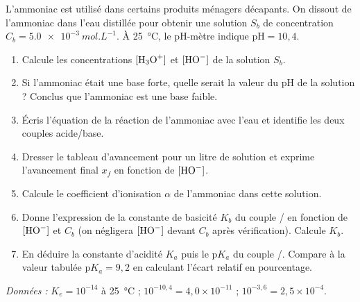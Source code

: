 \documentclass[11pt]{article}
\begin{document}
\begin{exercice}
L'ammoniac  est utilisé dans certains produits ménagers décapants. On dissout de l'ammoniac dans l'eau distillée pour obtenir une solution $S_b$ de concentration $C_b = \SI{5,0e-3}{mol.L^{-1}}$. À \SI{25}{\celsius}, le pH-mètre indique $\mathrm{pH} = 10,4$.
\begin{enumerate}
\item Calcule les concentrations $[\ce{H3O+}]$ et $[\ce{HO-}]$ de la solution $S_b$.
\item Si l'ammoniac était une base forte, quelle serait la valeur du pH de la solution ? Conclus que l'ammoniac est une base faible.
\item Écris l'équation de la réaction de l'ammoniac avec l'eau et identifie les deux couples acide/base.
\item Dresser le tableau d'avancement pour un litre de solution et exprime l'avancement final $x_f$ en fonction de $[\ce{HO-}]$.
\item Calcule le coefficient d'ionisation $\alpha$ de l'ammoniac dans cette solution.
\item Donne l'expression de la constante de basicité $K_b$ du couple / en fonction de $[\ce{HO-}]$ et $C_b$ (on négligera $[\ce{HO-}]$ devant $C_b$ après vérification). Calcule $K_b$.
\item En déduire la constante d'acidité $K_a$ puis le $\mathrm{p}K_a$ du couple /. Compare à la valeur tabulée $\mathrm{p}K_a = 9,2$ en calculant l'écart relatif en pourcentage.
\end{enumerate}
\emph{Données :} $K_e = 10^{-14}$ à \SI{25}{\celsius} ; $10^{-10,4} = 4,0\times 10^{-11}$ ; $10^{-3,6} = 2,5\times 10^{-4}$.
\end{exercice}
\end{document}
